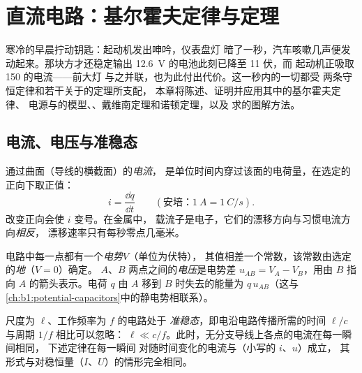 \chapter{直流电路：基尔霍夫定律与定理}\label{ch:b1:dc-circuits}

寒冷的早晨拧动钥匙：起动机发出呻吟，仪表盘灯
暗了一秒，汽车咳嗽几声便发动起来。那块方才还稳定输出
\qty{12.6}{V} 的电池此刻已降至 11 伏，而
起动机正吸取 150 的电流——前大灯
与之并联，也为此付出代价。这一秒内的一切都受
两条守恒定律和若干关于的定理所支配，
本章将陈述、证明并应用其中的基尔霍夫定律、
电源与的模型、、戴维南定理和诺顿定理，以及
求的图解方法。

\section{电流、电压与准稳态}

\begin{definition}[电流]\label{def:b1:dc-circuits:current}
通过曲面（导线的横截面）的\emph{电流}，
是单位时间内穿过该面的电荷量，在选定的
正向下取正值：
\[
i = \frac{\dd q}{\dd t} \qquad (\text{安培：} \qty{1}{A} = \qty{1}{C/s}).
\]
改变正向会使 $i$ 变号。在金属中，
载流子是电子，它们的漂移方向与习惯电流方向\emph{相反}，
漂移速率只有每秒零点几毫米。
\end{definition}

\begin{definition}[电势与电压]\label{def:b1:dc-circuits:voltage}
电路中每一点都有一个\emph{电势}$V$（单位为伏特），
其值相差一个常数，该常数由选定的\emph{地}（$V = 0$）确定。
$A$、$B$ 两点之间的\emph{电压}是电势差
$u_{AB} = V_A - V_B$，用由 $B$ 指向 $A$ 的箭头表示。电荷
$q$ 由 $A$ 移到 $B$ 时失去的能量为 $q\,u_{AB}$（这与
\cref{ch:b1:potential-capacitors}中的静电势相联系）。
\end{definition}

\begin{definition}\label{def:b1:dc-circuits:arqs}
尺度为 $\ell$、工作频率为 $f$ 的电路处于
\emph{准稳态}，即电沿电路传播所需的时间 $\ell/c$
与周期 $1/f$ 相比可以忽略：
$\ell \ll c/f$。此时，无分支导线上各点的电流在每一瞬间相同，
下述定律在每一瞬间
对随时间变化的电流与（小写的 $i$、$u$）成立，
其形式与对稳恒量（$I$、$U$）的情形完全相同。
\end{definition}

